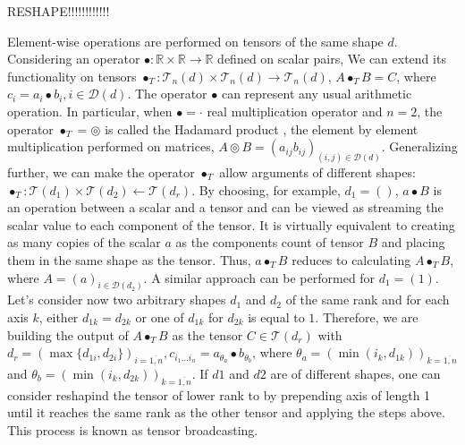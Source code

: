 \par RESHAPE!!!!!!!!!!!!

\par Element-wise operations are performed on tensors of the same shape $d$. Considering an operator $ \bullet : \mathbb{R} \times \mathbb{R} \rightarrow \mathbb{R}$ defined on scalar pairs, We can extend its functionality on tensors $ \bullet_T : \mathcal{T}_{n}(d) \times \mathcal{T}_{n}(d) \rightarrow \mathcal{T}_{n}(d)$, $A \bullet_T B = C$, where $c_i = a_i \bullet b_i, i \in \mathcal{D}(d)$. The operator $\bullet$ can represent any usual arithmetic operation. In particular, when $\bullet=\cdot$ real multiplication operator and $n=2$, the operator $\bullet_T = \circledcirc$  is called the Hadamard product \cite{D2l}, the element by element multiplication performed on matrices, $A \circledcirc B = (a_{i j} b_{i j})_{(i,j)\in \mathcal{D}(d)}$. Generalizing further, we can make the operator $\bullet_T$ allow arguments of different shapes: $\bullet_T : \mathcal{T}(d_1) \times \mathcal{T}(d_2)\leftarrow \mathcal{T}(d_r)$. By choosing, for example, $d_1=()$, $a \bullet B$ is an operation between a scalar and a tensor and can be viewed as streaming the scalar value to each component of the tensor. It is virtually equivalent to creating as many copies of the scalar $a$ as the components count of tensor $B$ and placing them in the same shape as the tensor. Thus, $a \bullet_T B$ reduces to calculating $A \bullet_T B$, where $A=(a)_{i\in \mathcal{D}(d_2)}$. A similar approach can be performed for $d_1=(1)$. Let's consider now two arbitrary shapes $d_1$ and $d_2$ of the same rank and for each axis $k$, either $d_{1 k} = d_{2 k}$ or one of $d_{1 k}$ for ${d_{2 k}}$ is equal to ${1}$. Therefore, we are building the output of $A \bullet_T B$ as the tensor $C \in \mathcal{T}(d_r)$ with $d_r=(\max{\{d_{1 i}, {d_{2 i}\}}})_{i=\overline{1,n}}, c_{i_1 \ldots i_n} = a_{\theta_a} \bullet b_{\theta_b}$, where $\theta_a = (\min{(i_k, d_{1 k})})_{k=\overline{1,n}}$ and $\theta_b = (\min{(i_k, d_{2 k})})_{k=\overline{1,n}}$. If $d1$ and $d2$ are of different shapes, one can consider reshapind the tensor of lower rank to by prepending axis of length 1 until it reaches the same rank as the other tensor and applying the steps above. This process is known as tensor broadcasting. 